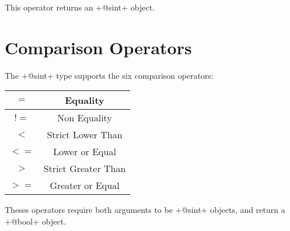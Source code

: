 This operator returns an \ggs+@sint+ object.







\section{Comparison Operators}

The \ggs+@sint+ type supports the six comparison operators:\newline

\begin{tabular}{|c|c|}
\hline
$=$ & Equality \\
\hline
$!=$ & Non Equality \\
\hline
$<$  & Strict Lower Than \\
\hline
$<=$  & Lower or Equal \\
\hline
$>$  & Strict Greater Than \\
\hline
$>=$  & Greater or Equal \\
\hline
\end{tabular}

Theses operators require both arguments to be \ggs+@sint+ objects, and return a \ggs+@bool+ object.


